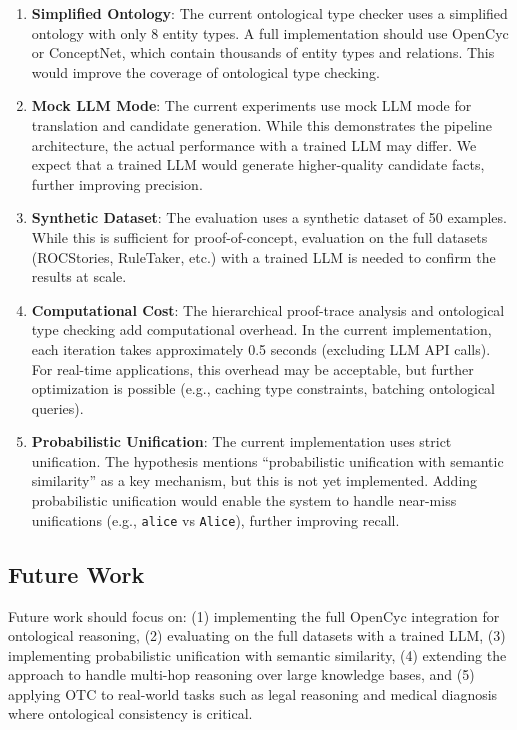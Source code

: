 \documentclass[11pt,letterpaper]{article}
\begin{document}
\begin{enumerate}
  \item \textbf{Simplified Ontology}: The current ontological type checker uses a simplified ontology with only 8 entity types. A full implementation should use OpenCyc or ConceptNet, which contain thousands of entity types and relations. This would improve the coverage of ontological type checking.

  \item \textbf{Mock LLM Mode}: The current experiments use mock LLM mode for translation and candidate generation. While this demonstrates the pipeline architecture, the actual performance with a trained LLM may differ. We expect that a trained LLM would generate higher-quality candidate facts, further improving precision.

  \item \textbf{Synthetic Dataset}: The evaluation uses a synthetic dataset of 50 examples. While this is sufficient for proof-of-concept, evaluation on the full datasets (ROCStories, RuleTaker, etc.) with a trained LLM is needed to confirm the results at scale.

  \item \textbf{Computational Cost}: The hierarchical proof-trace analysis and ontological type checking add computational overhead. In the current implementation, each iteration takes approximately 0.5 seconds (excluding LLM API calls). For real-time applications, this overhead may be acceptable, but further optimization is possible (e.g., caching type constraints, batching ontological queries).

  \item \textbf{Probabilistic Unification}: The current implementation uses strict unification. The hypothesis mentions ``probabilistic unification with semantic similarity'' as a key mechanism, but this is not yet implemented. Adding probabilistic unification would enable the system to handle near-miss unifications (e.g., \texttt{alice} vs \texttt{Alice}), further improving recall.
\end{enumerate}

\subsection{Future Work}

Future work should focus on: (1) implementing the full OpenCyc integration for ontological reasoning, (2) evaluating on the full datasets with a trained LLM, (3) implementing probabilistic unification with semantic similarity, (4) extending the approach to handle multi-hop reasoning over large knowledge bases, and (5) applying OTC to real-world tasks such as legal reasoning and medical diagnosis where ontological consistency is critical.
\end{document}
